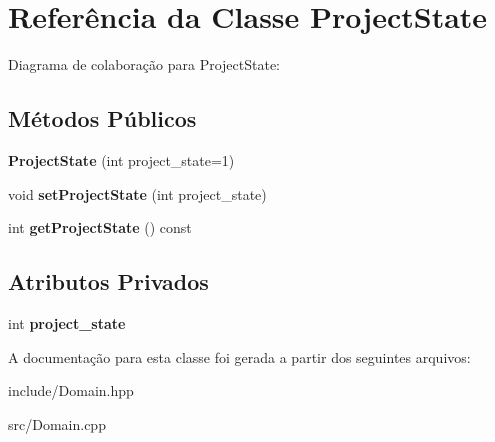\hypertarget{classProjectState}{}\section{Referência da Classe Project\+State}
\label{classProjectState}


Diagrama de colaboração para Project\+State\+:
\subsection*{Métodos Públicos}
\begin{DoxyCompactItemize}
\item 
{\bfseries Project\+State} (int project\+\_\+state=1)\hypertarget{classProjectState_a61af7f1893ff51ef66c4aeb46585db8e}{}\label{classProjectState_a61af7f1893ff51ef66c4aeb46585db8e}

\item 
void {\bfseries set\+Project\+State} (int project\+\_\+state)\hypertarget{classProjectState_a04b2df31e839624a758dd39f18dd522c}{}\label{classProjectState_a04b2df31e839624a758dd39f18dd522c}

\item 
int {\bfseries get\+Project\+State} () const \hypertarget{classProjectState_a27bad04e4d2c7becc39daf276c1841a1}{}\label{classProjectState_a27bad04e4d2c7becc39daf276c1841a1}

\end{DoxyCompactItemize}
\subsection*{Atributos Privados}
\begin{DoxyCompactItemize}
\item 
int {\bfseries project\+\_\+state}\hypertarget{classProjectState_ae498c9ef4da8937df35a12379ee1486a}{}\label{classProjectState_ae498c9ef4da8937df35a12379ee1486a}

\end{DoxyCompactItemize}


A documentação para esta classe foi gerada a partir dos seguintes arquivos\+:\begin{DoxyCompactItemize}
\item 
include/Domain.\+hpp\item 
src/Domain.\+cpp\end{DoxyCompactItemize}
